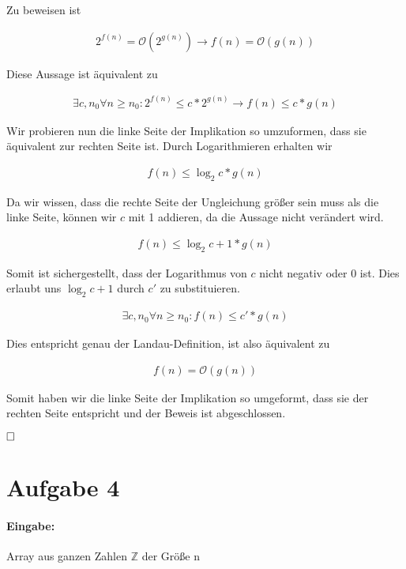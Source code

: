 \documentclass[12pt]{scrartcl}%
\theoremstyle{nonumberplain}
\newcommand{\bO}[1]{\mathcal O(#1)}
\begin{document}
Zu beweisen ist

\begin{align}
	2^{f(n)} = \bO{2^{g(n)}} \rightarrow f(n) = \bO{g(n)}
\end{align}

Diese Aussage ist äquivalent zu

\begin{align}
	\exists c,n_0 \forall n \ge n_0: 2^{f(n)} \le c * 2^{g(n)} \rightarrow f(n) \le c * g(n)
\end{align}

Wir probieren nun die linke Seite der Implikation so umzuformen, dass sie äquivalent zur rechten Seite ist. Durch Logarithmieren erhalten wir

\begin{align}
	f(n) \le \log_{2}{c} * g(n)
\end{align}

Da wir wissen, dass die rechte Seite der Ungleichung größer sein muss als die linke Seite, können wir $c$ mit 1 addieren, da die Aussage nicht verändert wird.

\begin{align}
	f(n) \le \log_{2}{c+1} * g(n) 
\end{align}

Somit ist sichergestellt, dass der Logarithmus von $c$ nicht negativ oder $0$ ist. Dies erlaubt uns $\log_{2}{c+1}$ durch $c'$ zu substituieren.

\begin{align}
	\exists c,n_0 \forall n \ge n_0: f(n) \le c' * g(n)
\end{align}

Dies entspricht genau der Landau-Definition, ist also äquivalent zu

\begin{align}
	f(n) = \bO{g(n)}
\end{align}

Somit haben wir die linke Seite der Implikation so umgeformt, dass sie der rechten Seite entspricht und der Beweis ist abgeschlossen.

$\hfill \square$

\newpage

\section*{Aufgabe 4}

\paragraph{Eingabe:} Array aus ganzen Zahlen $\mathbb{Z}$ der Größe n
\end{document}
